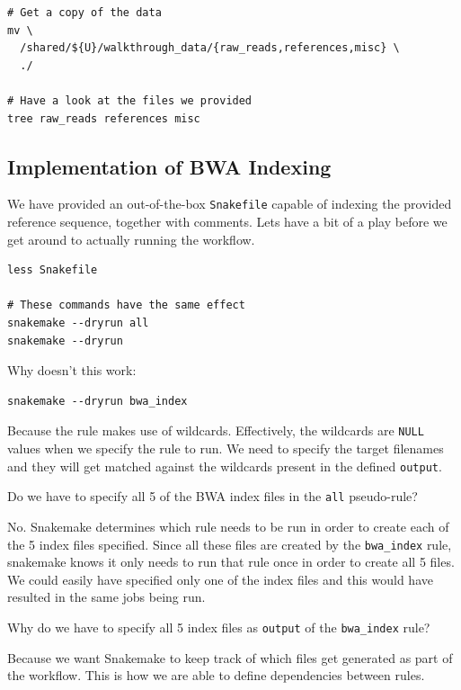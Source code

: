 \begin{lstlisting}
# Get a copy of the data
mv \
  /shared/${U}/walkthrough_data/{raw_reads,references,misc} \
  ./

# Have a look at the files we provided
tree raw_reads references misc
\end{lstlisting}

\subsection{Implementation of BWA Indexing}

We have provided an out-of-the-box \texttt{Snakefile} capable of indexing the provided reference sequence, together with comments.
Lets have a bit of a play before we get around to actually running the workflow.

\begin{lstlisting}
less Snakefile

# These commands have the same effect
snakemake --dryrun all
snakemake --dryrun
\end{lstlisting}


\begin{questions}

Why doesn't this work:

\begin{lstlisting}
snakemake --dryrun bwa_index
\end{lstlisting}

\begin{answer}

Because the rule makes use of wildcards.
Effectively, the wildcards are \texttt{NULL} values when we specify the rule to run. We need to specify the target filenames and they will get matched against the wildcards present in the defined \texttt{output}.

\end{answer}

Do we have to specify all 5 of the BWA index files in the \texttt{all} pseudo-rule?

\begin{answer}

No.
Snakemake determines which rule needs to be run in order to create each of the 5 index files specified.
Since all these files are created by the \texttt{bwa\_index} rule, snakemake knows it only needs to run that rule once in order to create all 5 files.
We could easily have specified only one of the index files and this would have resulted in the same jobs being run.

\end{answer}

Why do we have to specify all 5 index files as \texttt{output} of the \texttt{bwa\_index} rule?

\begin{answer}

Because we want Snakemake to keep track of which files get generated as part of the workflow.
This is how we are able to define dependencies between rules.

\end{answer}

\end{questions}


